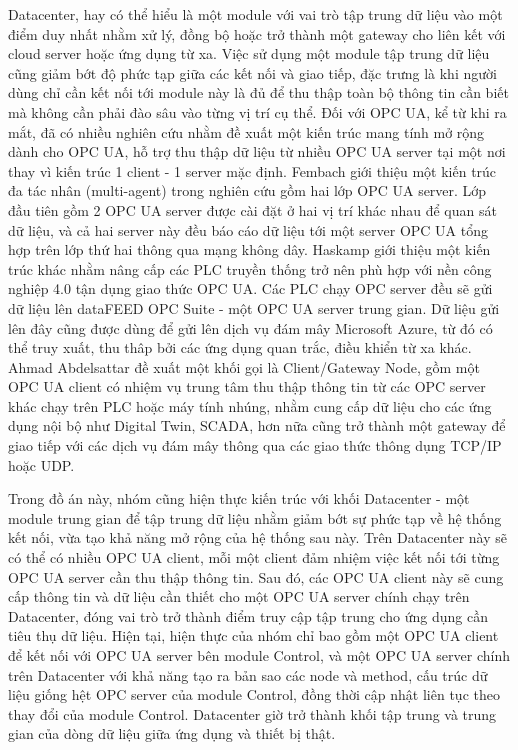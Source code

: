 
Datacenter, hay có thể hiểu là một module với vai trò tập trung dữ liệu vào một điểm duy nhất nhằm xử lý, đồng bộ hoặc trở thành một gateway cho liên kết với cloud server hoặc ứng dụng từ xa. Việc sử dụng một module tập trung dữ liệu cũng giảm bớt độ phức tạp giữa các kết nối và giao tiếp, đặc trưng là khi người dùng chỉ cần kết nối tới module này là đủ để thu thập toàn bộ thông tin cần biết mà không cần phải đào sâu vào từng vị trí cụ thể. Đối với OPC UA, kể từ khi ra mắt, đã có nhiều nghiên cứu nhằm đề xuất một kiến trúc mang tính mở rộng dành cho OPC UA, hỗ trợ thu thập dữ liệu từ nhiều OPC UA server tại một nơi thay vì kiến trúc 1 client - 1 server mặc định. Fembach \cite{fernbach2014opc} giới thiệu một kiến trúc đa tác nhân (multi-agent) trong nghiên cứu gồm hai lớp OPC UA server. Lớp đầu tiên gồm 2 OPC UA server được cài đặt ở hai vị trí khác nhau để quan sát dữ liệu, và cả hai server này đều báo cáo dữ liệu tới một server OPC UA tổng hợp trên lớp thứ hai thông qua mạng không dây. Haskamp \cite{haskamp2018implementing} giới thiệu một kiến trúc khác nhằm nâng cấp các PLC truyền thống trở nên phù hợp với nền công nghiệp 4.0 tận dụng giao thức OPC UA. Các PLC chạy OPC server đều sẽ gửi dữ liệu lên dataFEED OPC Suite - một OPC UA server trung gian. Dữ liệu gửi lên đây cũng được dùng để gửi lên dịch vụ đám mây Microsoft Azure, từ đó có thể truy xuất, thu thâp bởi các ứng dụng quan trắc, điều khiển từ xa khác. Ahmad Abdelsattar \cite{abdelsattaropcgateway} đề xuất một khối gọi là Client/Gateway Node, gồm một OPC UA client có nhiệm vụ trung tâm thu thập thông tin từ các OPC server khác chạy trên PLC hoặc máy tính nhúng, nhằm cung cấp dữ liệu cho các ứng dụng nội bộ như Digital Twin, SCADA, hơn nữa cũng trở thành một gateway để giao tiếp với các dịch vụ đám mây thông qua các giao thức thông dụng TCP/IP hoặc UDP.


Trong đồ án này, nhóm cũng hiện thực kiến trúc với khối Datacenter - một module trung gian để tập trung dữ liệu nhằm giảm bớt sự phức tạp về hệ thống kết nối, vừa tạo khả năng mở rộng của hệ thống sau này. Trên Datacenter này sẽ có thể có nhiều OPC UA client, mỗi một client đảm nhiệm việc kết nối tới từng OPC UA server cần thu thập thông tin. Sau đó, các OPC UA client này sẽ cung cấp thông tin và dữ liệu cần thiết cho một OPC UA server chính chạy trên Datacenter, đóng vai trò trở thành điểm truy cập tập trung cho ứng dụng cần tiêu thụ dữ liệu. Hiện tại, hiện thực của nhóm chỉ bao gồm một OPC UA client để kết nối với OPC UA server bên module Control, và một OPC UA server chính trên Datacenter với khả năng tạo ra bản sao các node và method, cấu trúc dữ liệu giống hệt OPC server của module Control, đồng thời cập nhật liên tục theo thay đổi của module Control. Datacenter giờ trở thành khối tập trung và trung gian của dòng dữ liệu giữa ứng dụng và thiết bị thật.


